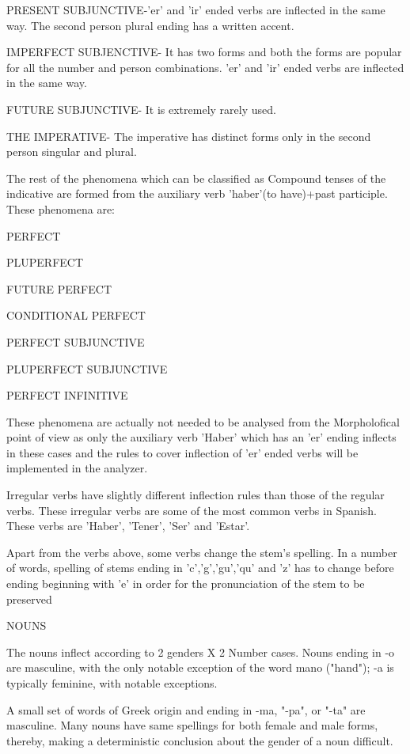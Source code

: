\documentclass[11pt,letterpaper]{article}
\begin{document}
PRESENT SUBJUNCTIVE-'er' and 'ir' ended verbs are inflected in the same way. The second person plural ending has a written accent.

IMPERFECT SUBJENCTIVE- It has two forms and both the forms are popular for all the number and person combinations. 'er' and 'ir' ended verbs are inflected in the same way.

FUTURE SUBJUNCTIVE- It is extremely rarely used.

THE IMPERATIVE- The imperative has distinct forms only in the second person singular and plural.

The rest of the phenomena which can be classified as Compound tenses of the indicative are formed from the auxiliary verb 'haber'(to have)+past participle. These phenomena are:

	PERFECT

	PLUPERFECT

	FUTURE PERFECT

	CONDITIONAL PERFECT

	PERFECT SUBJUNCTIVE

	PLUPERFECT SUBJUNCTIVE

	PERFECT INFINITIVE

These phenomena are actually not needed to be analysed from the Morpholofical point of view as only the auxiliary verb 'Haber' which has an 'er' ending inflects in these cases and the rules to cover inflection of 'er' ended verbs will be implemented in the analyzer.

Irregular verbs have slightly different inflection rules than those of the regular verbs. These irregular verbs are some of the most common verbs in Spanish. These verbs are 'Haber', 'Tener', 'Ser' and 'Estar'.

Apart from the verbs above, some verbs change the stem's spelling. In a number of words, spelling of stems ending in 'c','g','gu','qu' and 'z' has to change before ending beginning with 'e' in order for the pronunciation of the stem to be preserved


NOUNS

The nouns inflect according to 2 genders X 2 Number cases. Nouns ending in -o are masculine, with the only notable exception of the word mano ("hand"); -a is typically feminine, with notable exceptions.
 
A small set of words of Greek origin and ending in -ma, "-pa", or "-ta" are masculine. Many nouns have same spellings for both female and male forms, thereby, making a deterministic conclusion about the gender of a noun difficult.
\end{document}
